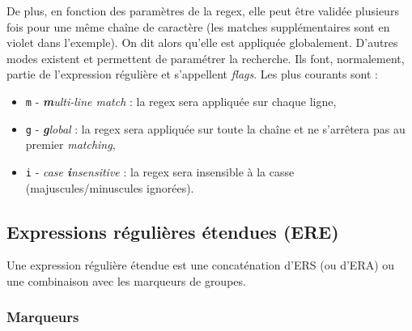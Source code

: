 De plus, en fonction des paramètres de la regex, elle peut être validée plusieurs fois pour une même chaîne de caractère (les matches supplémentaires sont en violet dans l'exemple). On dit alors qu'elle est appliquée globalement. D'autres modes existent et permettent de paramétrer la recherche. Ils font, normalement, partie de l'expression régulière et s'appellent \textit{flags}. Les plus courants sont :
\begin{itemize}
    \item \texttt{m} - \textit{\textbf{m}ulti-line match} : la regex sera appliquée sur chaque ligne,
    \item \texttt{g} - \textit{\textbf{g}lobal} : la regex sera appliquée sur toute la chaîne et ne s'arrêtera pas au premier \textit{matching},
    \item \texttt{i} - \textit{case \textbf{i}nsensitive} : la regex sera insensible à la casse (majuscules/minuscules ignorées).
\end{itemize}


\newpage
\subsection{Expressions régulières étendues (ERE)}

Une expression régulière étendue est une concaténation d'ERS (ou d'ERA) ou une combinaison avec les marqueurs de groupes.

\subsubsection{Marqueurs}

